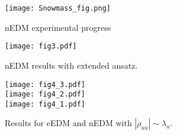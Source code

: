 \begin{figure}[p]
    \centering
    \texttt{[image: Snowmass\_fig.png]}
    \caption{nEDM experimental progress~\cite{Snowmass2022EDM}}
    \label{fig:snowmass}
\end{figure}

\begin{figure}[p]
    \centering
    \texttt{[image: fig3.pdf]}
    \caption{nEDM results with extended ansatz.}
    \label{fig:nEDM-fixed}
\end{figure}


\begin{figure}[p]
    \centering
    \texttt{[image: fig4\_3.pdf]}\\
    \texttt{[image: fig4\_2.pdf]}\\
    \texttt{[image: fig4\_1.pdf]}
    \caption{Results for eEDM and nEDM with \(|\rho_{uu}| \sim \lambda_{u}\).}
    \label{fig:nEDM-varied}
\end{figure}